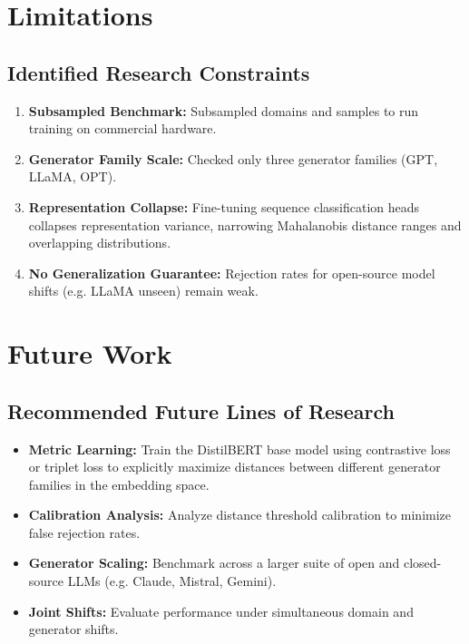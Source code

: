 \documentclass[12pt,a4paper]{report}
\begin{document}
\chapter{Limitations}
\label{ch:limitations}

\section{Identified Research Constraints}
\begin{enumerate}
    \item \textbf{Subsampled Benchmark:} Subsampled domains and samples to run training on commercial hardware.
    \item \textbf{Generator Family Scale:} Checked only three generator families (GPT, LLaMA, OPT).
    \item \textbf{Representation Collapse:} Fine-tuning sequence classification heads collapses representation variance, narrowing Mahalanobis distance ranges and overlapping distributions.
    \item \textbf{No Generalization Guarantee:} Rejection rates for open-source model shifts (e.g. LLaMA unseen) remain weak.
\end{enumerate}

\chapter{Future Work}
\label{ch:future}

\section{Recommended Future Lines of Research}
\begin{itemize}
    \item \textbf{Metric Learning:} Train the DistilBERT base model using contrastive loss or triplet loss to explicitly maximize distances between different generator families in the embedding space.
    \item \textbf{Calibration Analysis:} Analyze distance threshold calibration to minimize false rejection rates.
    \item \textbf{Generator Scaling:} Benchmark across a larger suite of open and closed-source LLMs (e.g. Claude, Mistral, Gemini).
    \item \textbf{Joint Shifts:} Evaluate performance under simultaneous domain and generator shifts.
\end{itemize}
\end{document}
